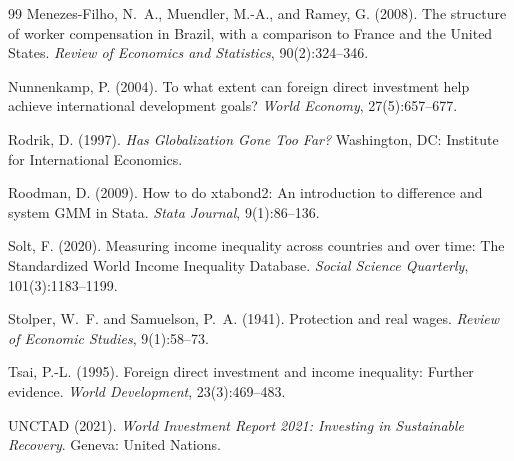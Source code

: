 \documentclass[12pt,a4paper]{article}
\begin{document}
\begin{thebibliography}{99}
Menezes-Filho, N.~A., Muendler, M.-A., and Ramey, G. (2008).
\newblock The structure of worker compensation in Brazil, with a comparison to France and the United States.
\newblock \textit{Review of Economics and Statistics}, 90(2):324--346.

Nunnenkamp, P. (2004).
\newblock To what extent can foreign direct investment help achieve international development goals?
\newblock \textit{World Economy}, 27(5):657--677.

Rodrik, D. (1997).
\newblock \textit{Has Globalization Gone Too Far?}
\newblock Washington, DC: Institute for International Economics.

Roodman, D. (2009).
\newblock How to do xtabond2: An introduction to difference and system GMM in Stata.
\newblock \textit{Stata Journal}, 9(1):86--136.

Solt, F. (2020).
\newblock Measuring income inequality across countries and over time: The Standardized World Income Inequality Database.
\newblock \textit{Social Science Quarterly}, 101(3):1183--1199.

Stolper, W.~F. and Samuelson, P.~A. (1941).
\newblock Protection and real wages.
\newblock \textit{Review of Economic Studies}, 9(1):58--73.

Tsai, P.-L. (1995).
\newblock Foreign direct investment and income inequality: Further evidence.
\newblock \textit{World Development}, 23(3):469--483.

UNCTAD (2021).
\newblock \textit{World Investment Report 2021: Investing in Sustainable Recovery}.
\newblock Geneva: United Nations.

\end{thebibliography}
\end{document}
